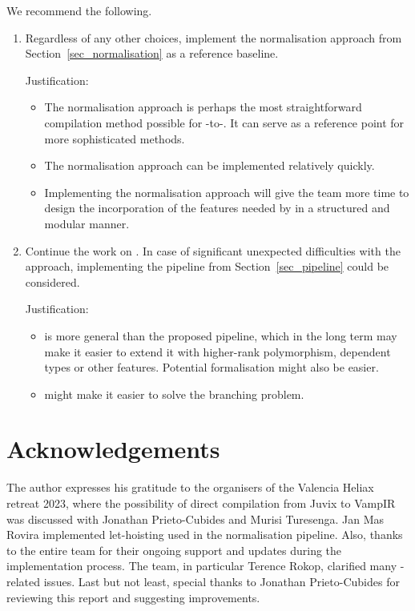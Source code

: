\documentclass[
    9pt,            %
    techreport,        %
    affiltop,       %
]{art}
\begin{document}
We recommend the following.
\begin{enumerate}
\item Regardless of any other choices, implement the normalisation
  approach from Section~\ref{sec_normalisation} as a reference
  baseline.
  \medskip

  Justification:
  \begin{itemize}
  \item The normalisation approach is perhaps the most straightforward
    compilation method possible for \Juvix{}-to-\VampIR{}. It can serve as a reference point for more sophisticated methods.
  \item The normalisation approach can be implemented relatively quickly.
  \item Implementing the normalisation approach will give the \Geb{} team
    more time to design the incorporation of the features needed by
    \Juvix{} in a structured and modular manner.
  \end{itemize}
\item Continue the work on \Geb{}. In case of significant unexpected
  difficulties with the \Geb{} approach, implementing the pipeline from
  Section~\ref{sec_pipeline} could be considered.
  \medskip

  Justification:
  \begin{itemize}
  \item \Geb{} is more general than the proposed pipeline, which in the
    long term may make it easier to extend it with higher-rank
    polymorphism, dependent types or other features. Potential
    formalisation might also be easier.
  \item \Geb{} might make it easier to solve the branching problem.
  \end{itemize}
\end{enumerate}


\section*{Acknowledgements}

The author expresses his gratitude to the organisers of the Valencia Heliax
retreat 2023, where the possibility of direct compilation from Juvix to VampIR was discussed with Jonathan Prieto-Cubides and Murisi Turesenga. Jan Mas Rovira implemented let-hoisting used in the normalisation pipeline. Also, thanks to the entire \VampIR{} team for their ongoing support and updates during the implementation process. The \Geb{} team, in particular Terence Rokop, clarified many \Geb{}-related issues. Last but not least, special thanks to Jonathan Prieto-Cubides for reviewing this report and suggesting improvements.
\end{document}
